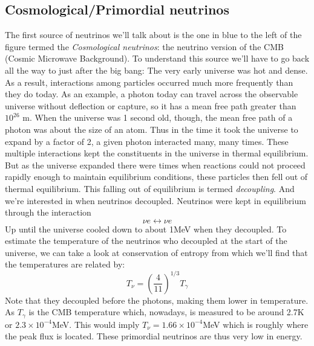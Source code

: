 \subsection{Cosmological/Primordial neutrinos}
The first source of neutrinos we'll talk about is the one in blue to the left of the figure
termed the \textit{Cosmological neutrinos}: 
the neutrino version of the CMB (Cosmic Microwave Background).
To understand this source we'll have to go back all the way to just after the big bang:
The very early universe was hot and dense. As a result, interactions among particles
occurred much more frequently than they do today. As an example, a photon today
can travel across the observable universe without deflection or capture, so it has a
mean free path greater than $10^{26}$ m. When the universe was 1 second old, though, 
the mean free path of a photon was about the size of an atom. Thus in
the time it took the universe to expand by a factor of 2, a given photon interacted
many, many times. These multiple interactions kept the constituents in the universe
in thermal equilibrium. But as the universe expanded there were times when reactions could
not proceed rapidly enough to maintain equilibrium conditions, these particles then fell out
of thermal equilibrium. This falling out of equilibrium is termed \textit{decoupling}.
And we're interested in when neutrinos decoupled.
Neutrinos were kept in equilibrium through the interaction 
\begin{equation}
	\nu e \leftrightarrow \nu e
\end{equation}
Up until the universe cooled down to about 1MeV when they decoupled.
To estimate the temperature of the neutrinos who decoupled at the start of the universe, 
we can take a look at conservation of entropy \cite{Dodelson} from which we'll find that
the temperatures are related by:
\begin{equation}
	T_\nu = \left(\frac{4}{11}\right)^{1/3}T_\gamma
\end{equation}
Note that they decoupled before the photons, making them lower in temperature.
As $T_\gamma$ is the CMB temperature which, nowadays, is measured to be around
2.7K or $2.3\times10^{-4}$MeV. This would imply $T_\nu = 1.66\times 10^{-4}$MeV which
is roughly where the peak flux is located.  These primordial neutrinos are thus very
low in energy.

